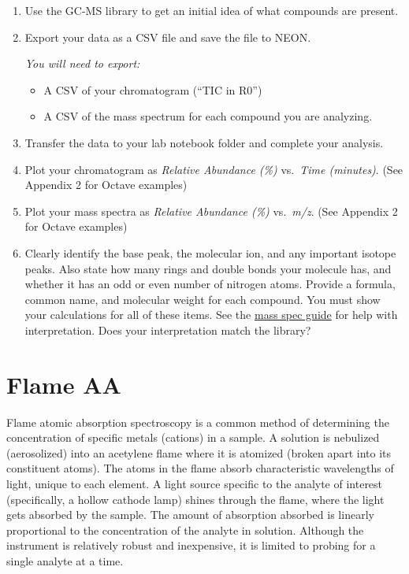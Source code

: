 \documentclass[]{tufte-book}
\providecommand{\tightlist}{%
  \setlength{\itemsep}{0pt}\setlength{\parskip}{0pt}}
\begin{document}
\begin{enumerate}
\def\labelenumi{\arabic{enumi}.}
\item
  Use the GC-MS library to get an initial idea of what compounds are present.
\item
  Export your data as a CSV file and save the file to NEON.

  \emph{You will need to export:}

  \begin{itemize}
  \tightlist
  \item
    A CSV of your chromatogram (``TIC in R0'')\\
  \item
    A CSV of the mass spectrum for each compound you are analyzing.
  \end{itemize}
\item
  Transfer the data to your lab notebook folder and complete your analysis.
\item
  Plot your chromatogram as \emph{Relative Abundance (\%)} vs.~\emph{Time (minutes)}. (See Appendix 2 for Octave examples)
\item
  Plot your mass spectra as \emph{Relative Abundance (\%)} vs.~\emph{m/z}. (See Appendix 2 for Octave examples)
\item
  Clearly identify the base peak, the molecular ion, and any important isotope peaks. Also state how many rings and double bonds your molecule has, and whether it has an odd or even number of nitrogen atoms. Provide a formula, common name, and molecular weight for each compound. You must show your calculations for all of these items. See the \href{/devel/chem370/guides/mass-spec}{mass spec guide} for help with interpretation. Does your interpretation match the library?
\end{enumerate}

\newpage

\hypertarget{flame-aa-1}{%
\section{Flame AA}\label{flame-aa-1}}

Flame atomic absorption spectroscopy is a common method of determining the concentration of specific metals (cations) in a sample. A solution is nebulized (aerosolized) into an acetylene flame where it is atomized (broken apart into its constituent atoms). The atoms in the flame absorb characteristic wavelengths of light, unique to each element. A light source specific to the analyte of interest (specifically, a hollow cathode lamp) shines through the flame, where the light gets absorbed by the sample. The amount of absorption absorbed is linearly proportional to the concentration of the analyte in solution. Although the instrument is relatively robust and inexpensive, it is limited to probing for a single analyte at a time.
\end{document}
